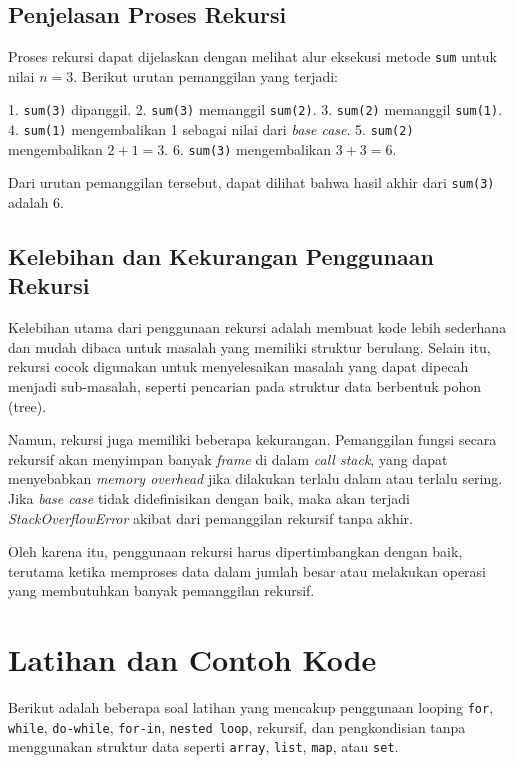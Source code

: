 \subsection{Penjelasan Proses Rekursi}

Proses rekursi dapat dijelaskan dengan melihat alur eksekusi metode \texttt{sum} untuk nilai \( n = 3 \). Berikut urutan pemanggilan yang terjadi:

1. \texttt{sum(3)} dipanggil.
2. \texttt{sum(3)} memanggil \texttt{sum(2)}.
3. \texttt{sum(2)} memanggil \texttt{sum(1)}.
4. \texttt{sum(1)} mengembalikan 1 sebagai nilai dari \textit{base case}.
5. \texttt{sum(2)} mengembalikan \( 2 + 1 = 3 \).
6. \texttt{sum(3)} mengembalikan \( 3 + 3 = 6 \).

Dari urutan pemanggilan tersebut, dapat dilihat bahwa hasil akhir dari \texttt{sum(3)} adalah 6.

\subsection{Kelebihan dan Kekurangan Penggunaan Rekursi}

Kelebihan utama dari penggunaan rekursi adalah membuat kode lebih sederhana dan mudah dibaca untuk masalah yang memiliki struktur berulang. Selain itu, rekursi cocok digunakan untuk menyelesaikan masalah yang dapat dipecah menjadi sub-masalah, seperti pencarian pada struktur data berbentuk pohon (tree). 

Namun, rekursi juga memiliki beberapa kekurangan. Pemanggilan fungsi secara rekursif akan menyimpan banyak \textit{frame} di dalam \textit{call stack}, yang dapat menyebabkan \textit{memory overhead} jika dilakukan terlalu dalam atau terlalu sering. Jika \textit{base case} tidak didefinisikan dengan baik, maka akan terjadi \textit{StackOverflowError} akibat dari pemanggilan rekursif tanpa akhir.

Oleh karena itu, penggunaan rekursi harus dipertimbangkan dengan baik, terutama ketika memproses data dalam jumlah besar atau melakukan operasi yang membutuhkan banyak pemanggilan rekursif.


\section{Latihan dan Contoh Kode}


Berikut adalah beberapa soal latihan yang mencakup penggunaan looping \texttt{for}, \texttt{while}, \texttt{do-while}, \texttt{for-in}, \texttt{nested loop}, rekursif, dan pengkondisian tanpa menggunakan struktur data seperti \texttt{array}, \texttt{list}, \texttt{map}, atau \texttt{set}.

